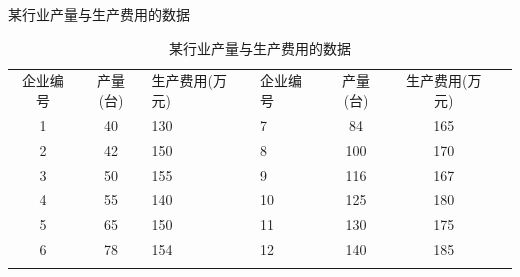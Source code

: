 \documentclass[bwprint]{gmcmthesis}
\begin{document}
某行业产量与生产费用的数据
\begin{table}[htp!]
\centering
\caption{某行业产量与生产费用的数据}%
\begin{tabularx}{0.94\textwidth}{c|c|YZc|c|Y}
    \Xhline{0.9pt}
	企业编号&	产量(台)&生产费用(万元)&企业编号&产量(台)&生产费用(万元)\\
	1&	40&	130&7&	84&	165\\
	2&	42&	150&8&	100&	170\\
	3&	50&	155&9&	116&	167\\
	4&	55&	140&10&	125&	180\\
	5&	65&	150&11&	130&	175\\
	6&	78&	154&12&	140&	185\\
    \Xhline{0.72pt}
\end{tabularx}
\end{table}
\end{document}
